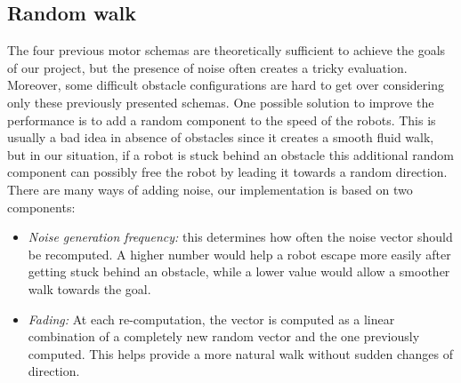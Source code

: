 \documentclass[journal]{IEEEtran}
\begin{document}
\subsection{Random walk}
The four previous motor schemas are theoretically sufficient to achieve the goals of our project, but the presence of noise often creates a tricky evaluation. Moreover, some difficult obstacle configurations are hard to get over considering only these previously presented schemas. One possible solution to improve the performance is to add a random component to the speed of the robots. This is usually a bad idea in absence of obstacles since it creates a smooth fluid walk, but in our situation, if a robot is stuck behind an obstacle this additional random component can possibly free the robot by leading it towards a random direction.
There are many ways of adding noise, our implementation is based on two
components:
\begin{itemize}
\item \textit{Noise generation frequency:} this determines how often the noise vector should be recomputed. A higher number would help a robot escape more easily after getting stuck behind an obstacle, while a lower value would allow a smoother walk towards the goal.
\item \textit{Fading:} At each re-computation, the vector is computed as a linear combination of a completely new random vector and the one previously computed. This helps provide a more natural walk without sudden changes of direction.
\end{itemize}





\end{document}
